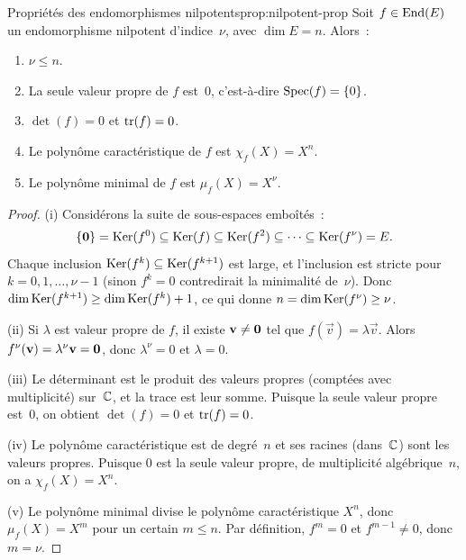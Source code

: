 \begin{proposition}{Propriétés des endomorphismes nilpotents}{prop:nilpotent-prop}
  Soit $f\in\operatorname{End}(E)$ un endomorphisme nilpotent d'indice~$\nu$, avec
  $\dim E=n$. Alors~:
  \begin{enumerate}[label=(\roman*)]
    \item $\nu\leq n$.
    \item La seule valeur propre de $f$ est~$0$, c'est-à-dire
      $\operatorname{Spec}(f)=\left\{0\right\}$.
    \item $\det(f)=0$ et $\operatorname{tr}(f)=0$.
    \item Le polynôme caractéristique de $f$ est $\chi_f(X)=X^n$.
    \item Le polynôme minimal de $f$ est $\mu_f(X)=X^\nu$.
  \end{enumerate}
\end{proposition}

\begin{proof}
  (i) Considérons la suite de sous-espaces emboîtés~:
  \[
    \left\{\mathbf{0}\right\}=\operatorname{Ker}(f^0)\subseteq\operatorname{Ker}(f)\subseteq\operatorname{Ker}(f^2)
    \subseteq\cdots\subseteq\operatorname{Ker}(f^\nu)=E.
  \]
  Chaque inclusion $\operatorname{Ker}(f^k)\subseteq\operatorname{Ker}(f^{k+1})$ est large, et
  l'inclusion est stricte pour $k=0,1,\ldots,\nu-1$ (sinon $f^k=0$
  contredirait la minimalité de~$\nu$). Donc
  $\dim\operatorname{Ker}(f^{k+1})\geq\dim\operatorname{Ker}(f^k)+1$, ce qui donne
  $n=\dim\operatorname{Ker}(f^\nu)\geq\nu$.

  (ii) Si $\lambda$ est valeur propre de $f$, il existe $\mathbf{v}\neq\mathbf{0}$
  tel que $f(\vec{v})=\lambda\vec{v}$. Alors
  $f^\nu(\mathbf{v})=\lambda^\nu\mathbf{v}=\mathbf{0}$, donc $\lambda^\nu=0$ et
  $\lambda=0$.

  (iii) Le déterminant est le produit des valeurs propres (comptées avec
  multiplicité) sur~${\mathbb{C}}$, et la trace est leur somme. Puisque la seule
  valeur propre est~$0$, on obtient $\det(f)=0$ et $\operatorname{tr}(f)=0$.

  (iv) Le polynôme caractéristique est de degré~$n$ et ses racines (dans~${\mathbb{C}}$)
  sont les valeurs propres. Puisque $0$ est la seule valeur propre, de
  multiplicité algébrique~$n$, on a $\chi_f(X)=X^n$.

  (v) Le polynôme minimal divise le polynôme caractéristique $X^n$,
  donc $\mu_f(X)=X^m$ pour un certain $m\leq n$. Par définition,
  $f^m=0$ et $f^{m-1}\neq 0$, donc $m=\nu$.
\end{proof}

